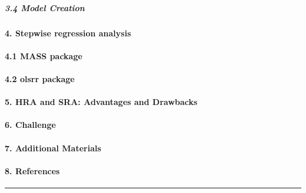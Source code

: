 \documentclass[
]{article}
\begin{document}
\hypertarget{model-creation}{%
\subparagraph{\texorpdfstring{ 3.4 Model Creation
}{ 3.4 Model Creation }}\label{model-creation}}

\hypertarget{stepwise-regression-analysis}{%
\paragraph{\texorpdfstring{ 4. Stepwise regression analysis
}{ 4. Stepwise regression analysis }}\label{stepwise-regression-analysis}}

\hypertarget{mass-package}{%
\paragraph{\texorpdfstring{ 4.1 MASS package
}{ 4.1 MASS package }}\label{mass-package}}

\hypertarget{olsrr-package}{%
\paragraph{\texorpdfstring{ 4.2 olsrr package
}{ 4.2 olsrr package }}\label{olsrr-package}}

\hypertarget{hra-and-sra-advantages-and-drawbacks}{%
\paragraph{\texorpdfstring{ 5. HRA and SRA: Advantages and Drawbacks
}{ 5. HRA and SRA: Advantages and Drawbacks }}\label{hra-and-sra-advantages-and-drawbacks}}

\hypertarget{challenge}{%
\paragraph{\texorpdfstring{ 6. Challenge
}{ 6. Challenge }}\label{challenge}}

\hypertarget{additional-materials}{%
\paragraph{\texorpdfstring{ 7. Additional Materials
}{ 7. Additional Materials }}\label{additional-materials}}

\hypertarget{references}{%
\paragraph{\texorpdfstring{ 8. References
}{ 8. References }}\label{references}}

\begin{center}\rule{0.5\linewidth}{0.5pt}\end{center}
\end{document}
